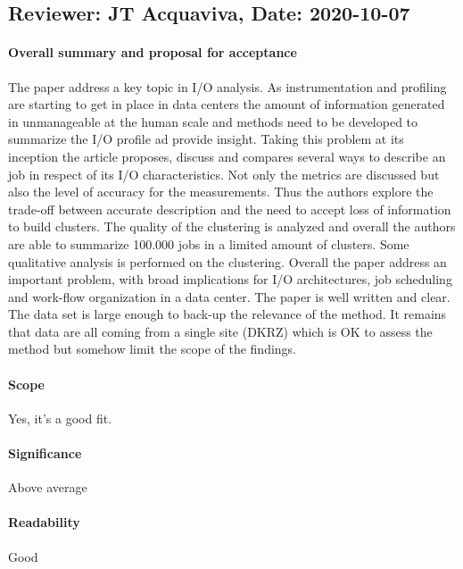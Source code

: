 \documentclass{jhps}
\begin{document}
{{{{  %


\reviews   %
\subsection*{Reviewer: JT Acquaviva, Date: 2020-10-07}

\paragraph{Overall summary and proposal for acceptance}

The paper address a key topic in I/O analysis. As instrumentation and profiling are starting to get in place in  data centers the amount of information generated in unmanageable at the human scale and methods need to be developed to summarize the I/O profile ad provide insight. Taking this problem at its inception the article proposes, discuss and compares several ways to describe an job in respect of its I/O characteristics. Not only the metrics are discussed but also the level of accuracy for the measurements. Thus the authors explore the trade-off between accurate description and the need to accept loss of information to build clusters.
The quality of the clustering is analyzed and overall the authors are able to summarize 100.000 jobs in a limited amount of clusters. Some qualitative analysis is performed on the clustering. Overall the paper address an important problem, with broad implications for I/O architectures, job scheduling and work-flow organization in a data center. The paper is well written and clear. The data set is large enough to back-up the relevance of the method. It remains that data are all coming from a single site (DKRZ) which is OK to assess the method but somehow limit the scope of the findings.

\paragraph{Scope}   %
Yes, it’s a good fit.
\paragraph{Significance}   %
Above average
\paragraph{Readability}   %
Good
}}}}
\end{document}
